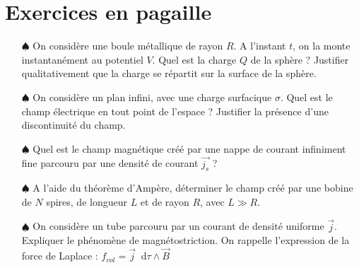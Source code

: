 \documentclass{report}
\newcommand*\dif{\mathop{}\!\mathrm{d}}
\begin{document}
\newpage

\section*{Exercices en pagaille}

\begin{itemize}

	\item[$\spadesuit$] On considère une boule métallique de rayon $R$. A l'instant $t$, on la monte instantanément au potentiel $V$. Quel est la charge $Q$ de la sphère ? Justifier qualitativement que la charge se répartit sur la surface de la sphère.
	
	\item[$\spadesuit$] On considère un plan infini, avec une charge surfacique $\sigma$. Quel est le champ électrique en tout point de l'espace ? Justifier la présence d'une discontinuité du champ. 
	
	\item[$\spadesuit$] Quel est le champ magnétique créé par une nappe de courant infiniment fine parcouru par une densité de courant $\vec{j_s}$ ? 
	
	\item[$\spadesuit$] A l'aide du théorème d'Ampère, déterminer le champ créé par une bobine de $N$ spires, de longueur $L$ et de rayon $R$, avec $L\gg R$.
	
	\item[$\spadesuit$] On considère un tube parcouru par un courant de densité uniforme $\vec{j}$. Expliquer le phénomène de magnétostriction. On rappelle l'expression de la force de Laplace : $f_{vol}=\vec{j}\dif\tau\wedge\vec{B}$
	
\end{itemize}
\end{document}
